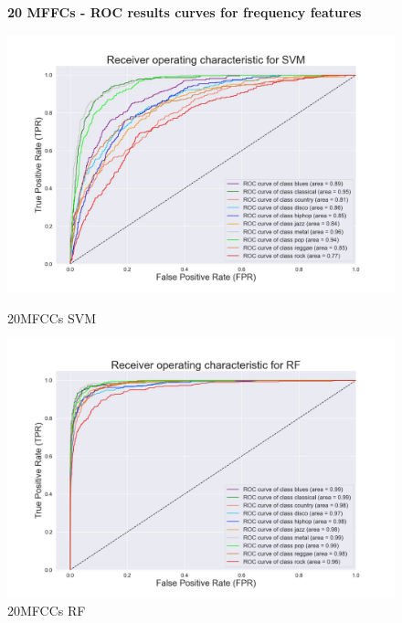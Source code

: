 \documentclass[conference]{IEEEtran}
\begin{document}
\begin{figure}[!ht]
    \begin{center}
        \small\textbf{20 MFFCs - ROC results curves for frequency features}\par\medskip    
        \begin{minipage}[t]{.24\textwidth}
            \centering
            \includegraphics[width=\textwidth]{plot/SL/frequency_features/20/SVM_20MFCC_10000_10GEN_GTZAN - ROC Plot.jpg}
            \caption{20MFCCs SVM}
            \label{fig:20MFCCs SVM Frequency Features}
        \end{minipage}
        \begin{minipage}[t]{.24\textwidth}
            \centering
            \includegraphics[width=\textwidth]{plot/SL/frequency_features/20/RF_20MFCC_10000_10GEN_GTZAN - ROC Plot.jpg}
            \caption{20MFCCs RF}
            \label{fig:20MFCCs RF Frequency Features}

\end{minipage}
\end{center}
\end{figure}
\end{document}
